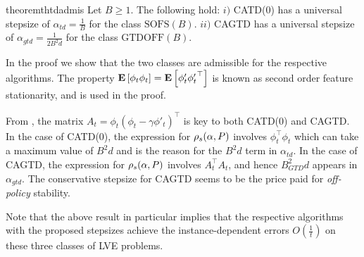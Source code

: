 \begin{table}[h]
\caption{Here, $S,A,\gamma$ are fixed across all the class and the second column shows the quantities that vary across the respective classes. These three capture \emph{on/off-policy} learning scenarios arising in RL.}
\end{table}
\fi
\begin{restatable}{theorem}{thtdadmis}\label{th:tdadmis}
Let $B\ge 1$.
The following hold:
$i)$ CATD(0) has a universal stepsize of $\alpha_{td}=\frac{1}{B}$ for  the class $\text{SOFS}(B)$.
$ii)$ CAGTD has a universal stepsize of $\alpha_{gtd}=\frac{1}{2B^2 d}$ for the class $\text{GTDOFF}(B)$.
\end{restatable}
In the proof we show that the two classes are admissible for the respective algorithms.
The property $\mathbf{E}\left[\phi_t\phi_t\right]=\mathbf{E}\left[\phi'_t{\phi'_t}^\top\right]$ is known as second order feature stationarity, and is used in the proof.
\fi

From , the matrix $A_t=\phi_t(\phi_t-\gamma\phi'_t)^\top$ is key to both CATD(0) and CAGTD. In the case of CATD(0),  the expression for $\rho_s(\alpha,P)$ involves $\phi^\top_t\phi_t$ which can take a maximum value of $B^2d$  and is the reason for the $B^2d$ term in $\alpha_{td}$. In the case of CAGTD, the expression for $\rho_s(\alpha,P)$ involves $A_t^\top A_t$, and hence $B^2_{GTD}d$ appears in $\alpha_{gtd}$. 
The conservative stepsize for CAGTD seems to be the price paid for \emph{off-policy} stability. 

Note that the above result in particular implies that the respective algorithms with the proposed stepsizes achieve the instance-dependent errors $O(\frac{1}{t})$ on these three classes of LVE problems.

